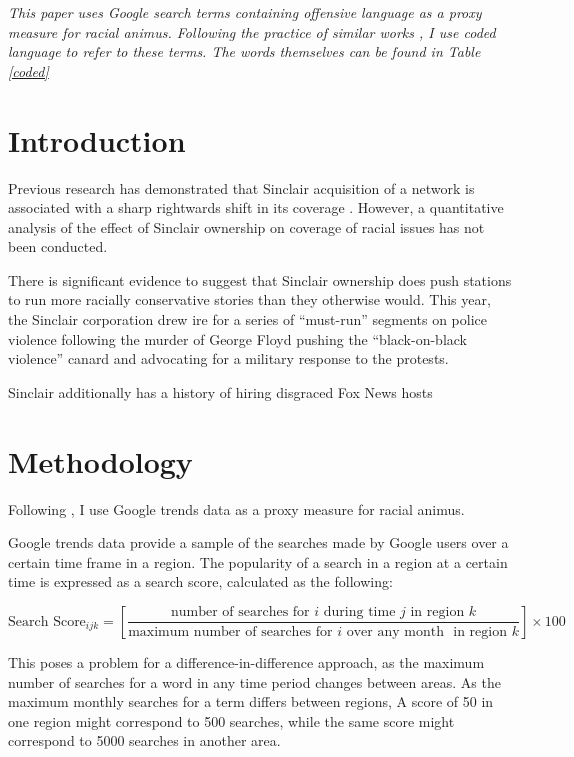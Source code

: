 \documentclass{article}
\begin{document}
\maketitle{}
\textit{This paper uses Google search terms containing offensive language as a proxy measure for racial animus. Following the practice of similar works \parencites{Stephens_Davidowitz_2014}{Chae_2015}{Chae_2018}{Isoya_2021}, I use coded language to refer to these terms. The words themselves can be found in Table \ref{coded}}

\section{Introduction}

Previous research has demonstrated that Sinclair acquisition of a network is associated with a sharp rightwards shift in its coverage \parencite[][]{Martin_2019}.
However, a quantitative analysis of the effect of Sinclair ownership on coverage of racial issues has not been conducted.

There is significant evidence to suggest that Sinclair ownership does push stations to run more racially conservative stories than they otherwise would.
This year, the Sinclair corporation drew ire for a series of ``must-run'' segments on police violence following the murder of George Floyd pushing the ``black-on-black violence'' canard and advocating for a military response to the protests.

Sinclair additionally has a history of hiring disgraced Fox News hosts

\section{Methodology}

Following \cite{Stephens_Davidowitz_2014}, I use Google trends data as a proxy measure for racial animus.

Google trends data provide a sample of the searches made by Google users over a certain time frame in a region.
The popularity of a search in a region at a certain time is expressed as a search score, calculated as the following:

\[
\text{Search Score}_{ijk} = [\frac{\text{number of searches for } i \text{ during time } j \text{ in region } k }{\text{maximum number of searches for } i \text{ over any month } \text{ in region } k }] \times 100
\]


This poses a problem for a difference-in-difference approach, as the maximum number of searches for a word in any time period changes between areas.
As the maximum monthly searches for a term differs between regions, A score of 50 in one region might correspond to 500 searches, while the same score might correspond to 5000 searches in another area.
\end{document}
